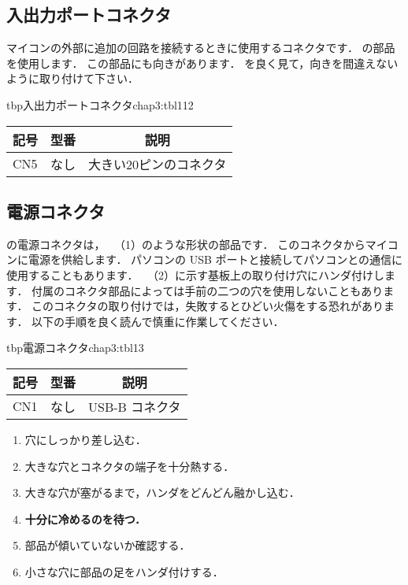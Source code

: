 \subsection{入出力ポートコネクタ}
マイコンの外部に追加の回路を接続するときに使用するコネクタです．
の部品を使用します．
この部品にも向きがあります．
を良く見て，向きを間違えないように取り付けて下さい．

\begin{mytable}{tbp}{入出力ポートコネクタ}{chap3:tbl112}
{\small\begin{tabular}{l|l|l}
\hline
\hline
\multicolumn{1}{c|}{記号} &
\multicolumn{1}{c|}{型番} &
\multicolumn{1}{c}{説明} \\
\hline
CN5 & なし & 大きい20ピンのコネクタ \\
\end{tabular}}
\end{mytable}


\subsection{電源コネクタ}

の電源コネクタは，
~（1）のような形状の部品です．
このコネクタからマイコンに電源を供給します．
パソコンの USB ポートと接続してパソコンとの通信に使用することもあります．
~（2）に示す基板上の取り付け穴にハンダ付けします．
付属のコネクタ部品によっては手前の二つの穴を使用しないこともあります．
このコネクタの取り付けでは，失敗するとひどい火傷をする恐れがあります．
以下の手順を良く読んで慎重に作業してください．

\begin{mytable}{tbp}{電源コネクタ}{chap3:tbl13}
{\small\begin{tabular}{l|l|l}
\hline
\hline
\multicolumn{1}{c|}{記号} &
\multicolumn{1}{c|}{型番} &
\multicolumn{1}{c}{説明} \\
\hline
CN1 & なし & USB-B コネクタ \\
\end{tabular}}
\end{mytable}


\begin{enumerate}
\item 穴にしっかり差し込む．
\item 大きな穴とコネクタの端子を十分熱する．
\item 大きな穴が塞がるまで，ハンダをどんどん融かし込む．
\item {\bf 十分に冷めるのを待つ．}
\item 部品が傾いていないか確認する．
\item 小さな穴に部品の足をハンダ付けする．
\end{enumerate}

